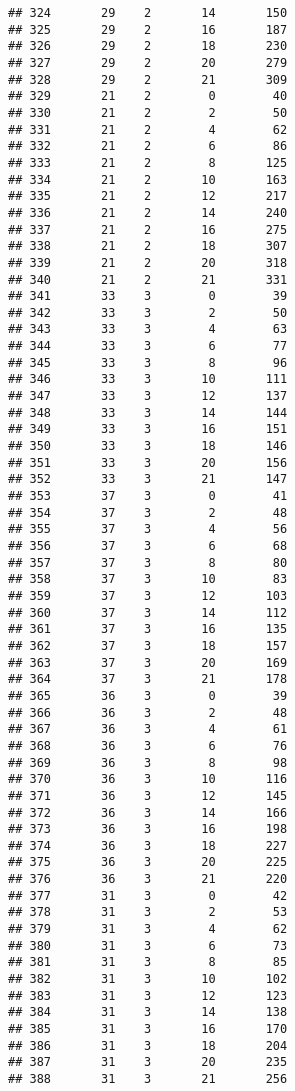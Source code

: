 \documentclass[
]{article}
\begin{document}
\begin{verbatim}
## 324       29    2       14       150
## 325       29    2       16       187
## 326       29    2       18       230
## 327       29    2       20       279
## 328       29    2       21       309
## 329       21    2        0        40
## 330       21    2        2        50
## 331       21    2        4        62
## 332       21    2        6        86
## 333       21    2        8       125
## 334       21    2       10       163
## 335       21    2       12       217
## 336       21    2       14       240
## 337       21    2       16       275
## 338       21    2       18       307
## 339       21    2       20       318
## 340       21    2       21       331
## 341       33    3        0        39
## 342       33    3        2        50
## 343       33    3        4        63
## 344       33    3        6        77
## 345       33    3        8        96
## 346       33    3       10       111
## 347       33    3       12       137
## 348       33    3       14       144
## 349       33    3       16       151
## 350       33    3       18       146
## 351       33    3       20       156
## 352       33    3       21       147
## 353       37    3        0        41
## 354       37    3        2        48
## 355       37    3        4        56
## 356       37    3        6        68
## 357       37    3        8        80
## 358       37    3       10        83
## 359       37    3       12       103
## 360       37    3       14       112
## 361       37    3       16       135
## 362       37    3       18       157
## 363       37    3       20       169
## 364       37    3       21       178
## 365       36    3        0        39
## 366       36    3        2        48
## 367       36    3        4        61
## 368       36    3        6        76
## 369       36    3        8        98
## 370       36    3       10       116
## 371       36    3       12       145
## 372       36    3       14       166
## 373       36    3       16       198
## 374       36    3       18       227
## 375       36    3       20       225
## 376       36    3       21       220
## 377       31    3        0        42
## 378       31    3        2        53
## 379       31    3        4        62
## 380       31    3        6        73
## 381       31    3        8        85
## 382       31    3       10       102
## 383       31    3       12       123
## 384       31    3       14       138
## 385       31    3       16       170
## 386       31    3       18       204
## 387       31    3       20       235
## 388       31    3       21       256

\end{verbatim}
\end{document}
